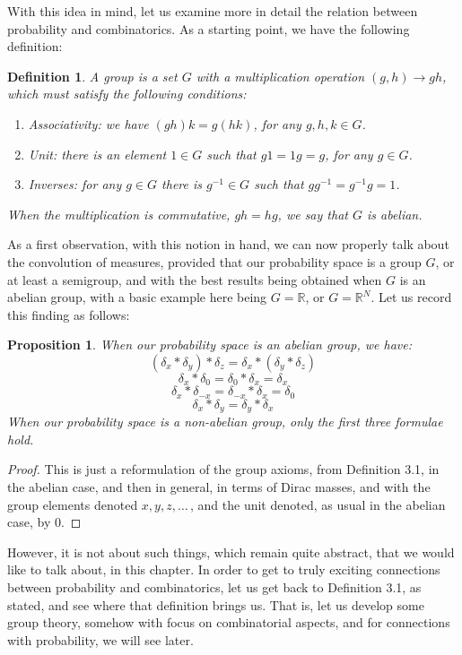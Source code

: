 \documentclass[12pt]{amsbook}
\newtheorem{definition}[theorem]{Definition}
\newtheorem{proposition}[theorem]{Proposition}
\begin{document}
\bigskip

With this idea in mind, let us examine more in detail the relation between probability and combinatorics. As a starting point, we have the following definition:


\begin{definition}
A group is a set $G$ with a multiplication operation $(g,h)\to gh$, which must satisfy the following conditions:
\begin{enumerate}
\item Associativity: we have $(gh)k=g(hk)$, for any $g,h,k\in G$.

\item Unit: there is an element $1\in G$ such that $g1=1g=g$, for any $g\in G$.

\item Inverses: for any $g\in G$ there is $g^{-1}\in G$ such that $gg^{-1}=g^{-1}g=1$.
\end{enumerate}
When the multiplication is commutative, $gh=hg$, we say that $G$ is abelian.
\end{definition}

As a first observation, with this notion in hand, we can now properly talk about the convolution of measures, provided that our probability space is a group $G$, or at least a semigroup, and with the best results being obtained when $G$ is an abelian group, with a basic example here being $G=\mathbb R$, or $G=\mathbb R^N$. Let us record this finding as follows:

\begin{proposition}
When our probability space is an abelian group, we have:
$$(\delta_x*\delta_y)*\delta_z=\delta_x*(\delta_y*\delta_z)$$
$$\delta_x*\delta_0=\delta_0*\delta_x=\delta_x$$
$$\delta_x*\delta_{-x}=\delta_{-x}*\delta_x=\delta_0$$
$$\delta_x*\delta_y=\delta_y*\delta_x$$
When our probability space is a non-abelian group, only the first three formulae hold.
\end{proposition}

\begin{proof}
This is just a reformulation of the group axioms, from Definition 3.1, in the abelian case, and then in general, in terms of Dirac masses, and with the group elements denoted $x,y,z,\ldots\,$, and the unit denoted, as usual in the abelian case, by $0$. 
\end{proof}

However, it is not about such things, which remain quite abstract, that we would like to talk about, in this chapter. In order to get to truly exciting connections between probability and combinatorics, let us get back to Definition 3.1, as stated, and see where that definition brings us. That is, let us develop some group theory, somehow with focus on combinatorial aspects, and for connections with probability, we will see later.
\end{document}

